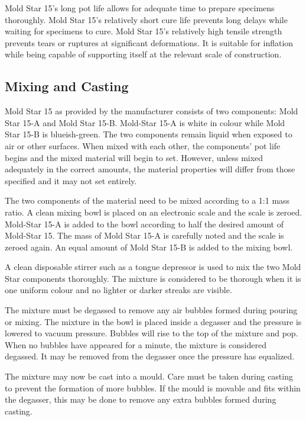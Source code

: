 Mold Star 15's long pot life allows for adequate time to prepare specimens thoroughly. Mold Star 15's relatively short cure life prevents long delays while waiting for specimens to cure. Mold Star 15's relatively high tensile strength prevents tears or ruptures at significant deformations. It is suitable for inflation while being capable of supporting itself at the relevant scale of construction. 

\subsection{Mixing and Casting}
\label{ssec:mac}

Mold Star 15 as provided by the manufacturer consists of two components: Mold Star 15-A and Mold Star 15-B. Mold-Star 15-A is white in colour while Mold Star 15-B is blueish-green. The two components remain liquid when exposed to air or other surfaces. When mixed with each other, the components' pot life begins and the mixed material will begin to set. However, unless mixed adequately in the correct amounts, the material properties will differ from those specified and it may not set entirely.

The two components of the material need to be mixed according to a 1:1 mass ratio. A clean mixing bowl is placed on an electronic scale and the scale is zeroed. Mold-Star 15-A is added to the bowl according to half the desired amount of Mold-Star 15. The mass of Mold Star 15-A is carefully noted and the scale is zeroed again. An equal amount of Mold Star 15-B is added to the mixing bowl.

A clean disposable stirrer such as a tongue depressor is used to mix the two Mold Star components thoroughly. The mixture is considered to be thorough when it is one uniform colour and no lighter or darker streaks are visible.

The mixture must be degassed to remove any air bubbles formed during pouring or mixing. The mixture in the bowl is placed inside a degasser and the pressure is lowered to vacuum pressure. Bubbles will rise to the top of the mixture and pop. When no bubbles have appeared for a minute, the mixture is considered degassed. It may be removed from the degasser once the pressure has equalized.

The mixture may now be cast into a mould. Care must be taken during casting to prevent the formation of more bubbles. If the mould is movable and fits within the degasser, this may be done to remove any extra bubbles formed during casting.


